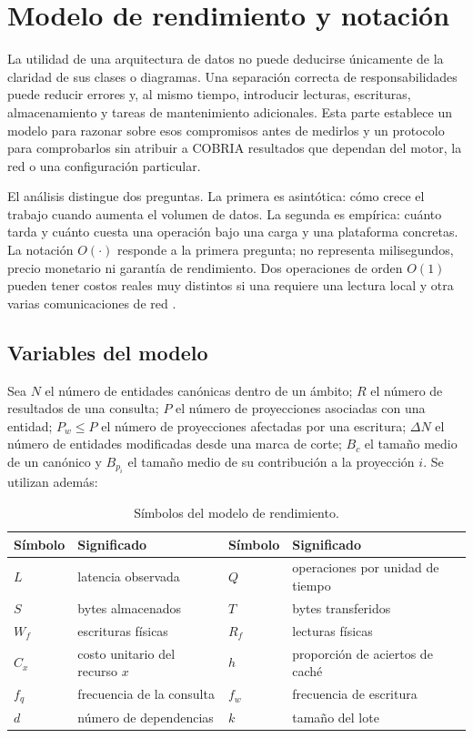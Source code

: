 \chapter{Modelo de rendimiento y notación}

La utilidad de una arquitectura de datos no puede deducirse únicamente de la claridad
de sus clases o diagramas. Una separación correcta de responsabilidades puede reducir
errores y, al mismo tiempo, introducir lecturas, escrituras, almacenamiento y tareas de
mantenimiento adicionales. Esta parte establece un modelo para razonar sobre esos
compromisos antes de medirlos y un protocolo para comprobarlos sin atribuir a COBRIA
resultados que dependan del motor, la red o una configuración particular.

El análisis distingue dos preguntas. La primera es asintótica: cómo crece el trabajo
cuando aumenta el volumen de datos. La segunda es empírica: cuánto tarda y cuánto cuesta
una operación bajo una carga y una plataforma concretas. La notación $O(\cdot)$ responde
a la primera pregunta; no representa milisegundos, precio monetario ni garantía de
rendimiento. Dos operaciones de orden $O(1)$ pueden tener costos reales muy distintos
si una requiere una lectura local y otra varias comunicaciones de red
\parencite{cormen2022algorithms}.

\section{Variables del modelo}

Sea $N$ el número de entidades canónicas dentro de un ámbito; $R$ el número de resultados
de una consulta; $P$ el número de proyecciones asociadas con una entidad; $P_w\leq P$ el
número de proyecciones afectadas por una escritura; $\Delta N$ el número de entidades
modificadas desde una marca de corte; $B_c$ el tamaño medio de un canónico y $B_{p_i}$ el
tamaño medio de su contribución a la proyección $i$. Se utilizan además:

\begin{table}[H]
\centering
\caption{Símbolos del modelo de rendimiento.}
\label{tab:simbolos-rendimiento}
\begin{tabularx}{\textwidth}{>{\bfseries}p{2cm}X>{\bfseries}p{2cm}X}
\toprule
Símbolo & Significado & Símbolo & Significado \\
\midrule
$L$ & latencia observada & $Q$ & operaciones por unidad de tiempo \\
$S$ & bytes almacenados & $T$ & bytes transferidos \\
$W_f$ & escrituras físicas & $R_f$ & lecturas físicas \\
$C_x$ & costo unitario del recurso $x$ & $h$ & proporción de aciertos de caché \\
$f_q$ & frecuencia de la consulta & $f_w$ & frecuencia de escritura \\
$d$ & número de dependencias & $k$ & tamaño del lote \\
\bottomrule
\end{tabularx}
\end{table}

